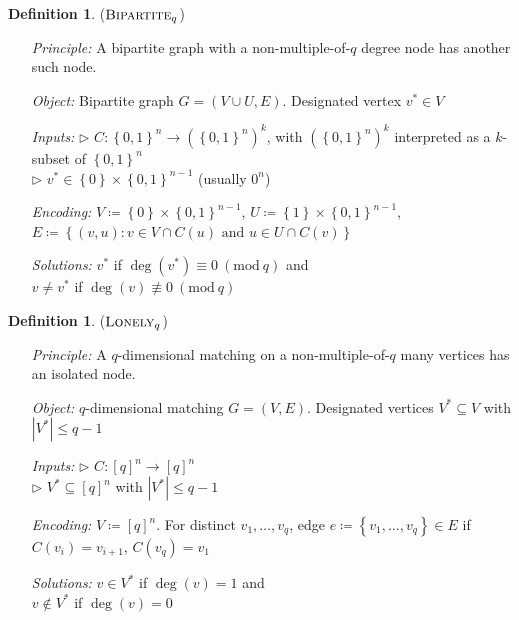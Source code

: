 \documentclass[10pt,a4paper]{article}
\theoremstyle{definition}
\newtheorem{definition}[theorem]{Definition}
\theoremstyle{remark}
\newcommand{\contour}[2]{#2}
\newcommand{\inparen}[1]{\left ( #1 \right )}
\renewcommand{\mod}[1]{~\inparen{\mathrm{mod}~#1}}
\def\set#1{\left\{#1\right\}}
\newcommand{\bit}{\ensuremath{\set{0,1}}}
\newcommand{\lonely}{\ensuremath\textsc{Lonely}}
\newcommand{\bipartite}{\ensuremath{\textsc{Bipartite}}}
\begin{document}
\noindent
\begin{minipage}{\linewidth}
\begin{definition}
	\label{def:bipartite} \contour{black}{($\bipartite_q$)}\vspace{-5pt}
	\begin{itemize}[leftmargin=2.15cm,itemsep=4pt]
		\item[\slshape Principle:] A bipartite graph with a non-multiple-of-$q$ degree node has another such node.
		\item[\slshape Object:] Bipartite graph $G = (V \cup U, E)$. Designated vertex $v^* \in V$
		\item[\slshape Inputs:] $\triangleright$ $C:\bit^n \to (\bit^n)^k$, with $(\bit^n)^k$ interpreted as a $k$-subset of $\bit^n$\\
	$\triangleright$ $v^* \in \set{0}\times\bit^{n-1}$ (usually $0^n$)
		\item[\slshape Encoding:] $V\coloneqq\set{0}\times\bit^{n-1}$, $U\coloneqq\set{1}\times\bit^{n-1}$,\\
	$E \coloneqq \set{(v,u) : v \in V \cap C(u) \text{ and } u \in U \cap C(v)}$
		\item[\slshape Solutions:] $v^*$ if $\deg(v^*) \equiv 0 \mod{q}$ and\\
	$v \ne v^*$ if $\deg(v) \not\equiv 0 \mod{q}$
	\end{itemize}
\end{definition}
\end{minipage}\vspace{5mm}



\noindent
\begin{minipage}{\linewidth}
\begin{definition}
	\label{def:lonely} \contour{black}{($\lonely_q$)}\vspace{-5pt}
	\begin{itemize}[leftmargin=2.15cm,itemsep=4pt]
		\item[\slshape Principle:] A $q$-dimensional matching on a non-multiple-of-$q$ many vertices has an isolated node.
		\item[\slshape Object:] $q$-dimensional matching $G = (V, E)$. Designated vertices $V^* \subseteq V$ with $|V^*| \le q-1$
		\item[\slshape Inputs:] $\triangleright$ $C:[q]^n \to [q]^n$\\
	$\triangleright$ $V^* \subseteq [q]^n$ with $|V^*| \le q-1$
		\item[\slshape Encoding:] $V\coloneqq[q]^n$. For distinct $v_1, \ldots, v_q$, edge $e\coloneqq\set{v_1, \ldots, v_q}\in E$ if $C(v_i) = v_{i+1}$, $C(v_q) = v_1$
		\item[\slshape Solutions:] $v \in V^*$ if $\deg(v) = 1$ and\\
	$v \notin V^*$ if $\deg(v) = 0$
	\end{itemize}
\end{definition}
\end{minipage}\vspace{5mm}
\end{document}
